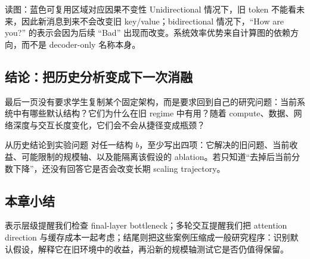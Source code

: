 \begin{knowledgebox}{读图：蓝色可复用区域对应因果不变性}
Unidirectional 情况下，旧 token 不能看未来，因此新消息到来不会改变旧 key/value；bidirectional 情况下，``How are you?'' 的表示会因为后续 ``Bad'' 出现而改变。系统效率优势来自计算图的依赖方向，而不是 decoder-only 名称本身。
\end{knowledgebox}



\subsection{结论：把历史分析变成下一次消融}

最后一页没有要求学生复制某个固定架构，而是要求回到自己的研究问题：当前系统中有哪些默认结构？它们为什么在旧 regime 中有用？随着 compute、数据、网络深度与交互长度变化，它们会不会从捷径变成瓶颈？



\begin{importantbox}{从历史结论到实验问题}
对任一结构 $b$，至少写出四项：它解决的旧问题、当前收益、可能限制的规模轴、以及能隔离该假设的 ablation。若只知道“去掉后当前分数下降”，还没有回答它是否会改变长期 scaling trajectory。
\end{importantbox}

\subsection{本章小结}

表示层级提醒我们检查 final-layer bottleneck；多轮交互提醒我们把 attention direction 与缓存成本一起考虑；结尾则把这些案例压缩成一般研究程序：识别默认假设，解释它在旧环境中的收益，再沿新的规模轴测试它是否仍值得保留。

